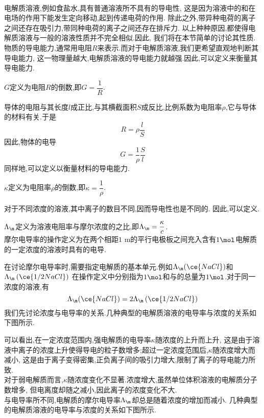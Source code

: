 \documentclass{ctexart}
\begin{document}
\pagestyle{plain}
\noindent{}\vspace{15pt}\\
\indent 电解质溶液,例如食盐水,具有普通溶液所不具有的导电性,%
这是因为溶液中的和在电场的作用下能发生定向移动,起到传递电荷的作用.%
除此之外,带异种电荷的离子之间还存在吸引力,带同种电荷的离子之间还存在排斥力.%
以上种种原因,都使得电解质溶液与一般的溶液性质并不完全相似.因此,%
我们将在本节简单的讨论其性质.\vspace{12pt}\\
\indent 物质的导电能力,通常用电阻$R$来表示.而对于电解质溶液,我们更希望直观地判断其导电能力,%
这一物理量越大,电解质溶液的导电能力就越强.因此,可以定义来衡量其导电能力.
\begin{definition}[6A.1.1 电导]
    $G$定义为电阻$R$的倒数,即$G=\dfrac1R$.
\end{definition}
导体的电阻与其长度$l$成正比,与其横截面积$S$成反比,比例系数为电阻率$\rho$,它与导体的材料有关.于是
\[R=\rho\dfrac{l}{S}\]
因此,物体的电导
\[G=\dfrac{1}{\rho}\dfrac{S}{l}\]
同样地,可以定义以衡量材料的导电能力.
\begin{definition}[6A.1.2 电导率]
    $\kappa$定义为电阻率$\rho$的倒数,即$\kappa=\dfrac{1}{\rho}$.
\end{definition}
对于不同浓度的溶液,其中离子的数目不同,因而导电性也是不同的.%
因此,可以定义.
\begin{definition}[6A.1.3 摩尔电导率]
    $\Lambda_\m$定义为溶液电阻率与摩尔浓度的之比,即$\Lambda_\m=\dfrac{\kappa}{c}$.\\
    摩尔电导率的操作定义\footnotemark 为在两个相距$1\text{ m}$的平行电极板之间充入含有$1\mol$电解质的一定浓度的溶液时具有的电导.
\end{definition}
在讨论摩尔电导率时,需要指定电解质的基本单元.例如$\Lambda_\m(\ce{NaCl})$和$\displaystyle\Lambda_\m\left(\ce{1/2NaCl}\right)$%
在操作定义中分别指为$1\mol$和与的总量为$1\mol$.对于同一浓度的溶液,有
\[\Lambda_\m(\ce{NaCl})=2\Lambda_\m\left(\ce{1/2NaCl}\right)\]
\indent 我们先讨论浓度与电导率的关系.几种典型的电解质溶液的电导率与浓度的关系如下图所示.
\begin{tightcenter}
    
\end{tightcenter}
可以看出,在一定浓度范围内,强电解质的电导率$\kappa$随浓度的上升而上升,%
这是由于溶液中离子的浓度上升使得导电的粒子数增多;超过一定浓度范围后,$\kappa$随浓度增大而减小,%
这是由于离子变得密集,正负离子间的吸引力增大,限制了离子的导电能力所致.\\
\indent 对于弱电解质而言,$\kappa$随浓度变化不显著.浓度增大,虽然单位体积溶液的电解质分子数增多,%
但电离度却随之减小,因此离子的浓度变化不大.\\
\indent 与电导率所不同,电解质的摩尔电导率$\Lambda_\m$却总是随着浓度的增加而减小.%
几种典型的电解质溶液的电导率与浓度的关系如下图所示.
\end{document}
